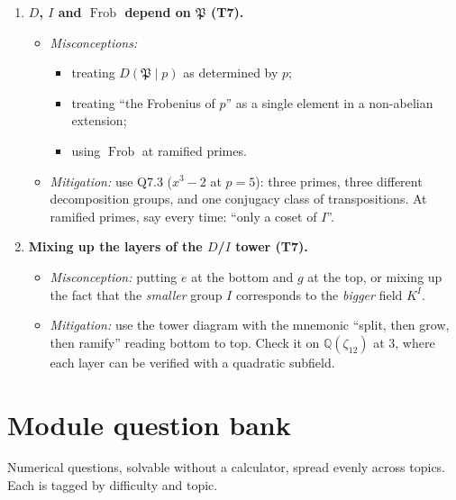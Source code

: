 \documentclass[11pt]{article}
\newcommand{\Q}{\mathbb{Q}}
\newcommand{\fP}{\mathfrak{P}}
\DeclareMathOperator{\Frob}{Frob}
\begin{document}
\begin{enumerate}[label=\textbf{D\arabic*.}]
  \item \textbf{$D$, $I$ and $\Frob$ depend on $\fP$ (T7).}
  \begin{itemize}
    \item \emph{Misconceptions:}
    \begin{itemize}
      \item treating $D(\fP\mid p)$ as determined by $p$;
      \item treating ``the Frobenius of $p$'' as a single element in a non-abelian extension;
      \item using $\Frob$ at ramified primes.
    \end{itemize}
    \item \emph{Mitigation:} use Q7.3 ($x^3-2$ at $p=5$): three primes, three different decomposition groups, and one conjugacy class of transpositions. At ramified primes, say every time: ``only a coset of $I$''.
  \end{itemize}

  \item \textbf{Mixing up the layers of the $D$/$I$ tower (T7).}
  \begin{itemize}
    \item \emph{Misconception:} putting $e$ at the bottom and $g$ at the top, or mixing up the fact that the \emph{smaller} group $I$ corresponds to the \emph{bigger} field $K^I$.
    \item \emph{Mitigation:} use the tower diagram with the mnemonic ``split, then grow, then ramify'' reading bottom to top. Check it on $\Q(\zeta_{12})$ at 3, where each layer can be verified with a quadratic subfield.
  \end{itemize}
\end{enumerate}

\section{Module question bank}

Numerical questions, solvable without a calculator, spread evenly across topics. Each is tagged by difficulty and topic.
\end{document}
